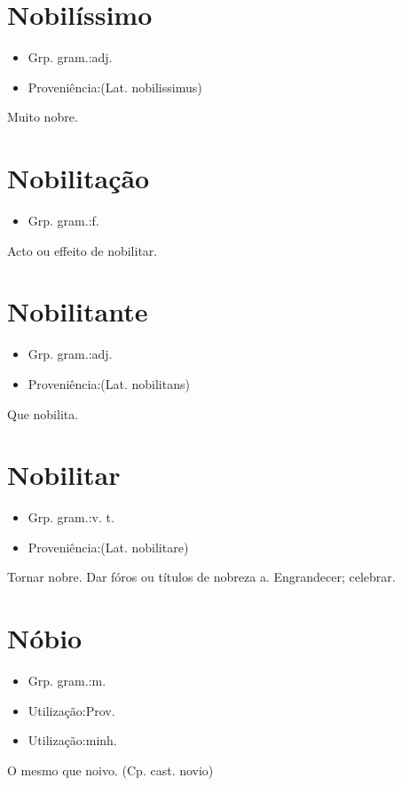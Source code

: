 \section{Nobilíssimo}
\begin{itemize}
\item {Grp. gram.:adj.}
\end{itemize}
\begin{itemize}
\item {Proveniência:(Lat. \textunderscore nobilissimus\textunderscore )}
\end{itemize}
Muito nobre.
\section{Nobilitação}
\begin{itemize}
\item {Grp. gram.:f.}
\end{itemize}
Acto ou effeito de nobilitar.
\section{Nobilitante}
\begin{itemize}
\item {Grp. gram.:adj.}
\end{itemize}
\begin{itemize}
\item {Proveniência:(Lat. \textunderscore nobilitans\textunderscore )}
\end{itemize}
Que nobilita.
\section{Nobilitar}
\begin{itemize}
\item {Grp. gram.:v. t.}
\end{itemize}
\begin{itemize}
\item {Proveniência:(Lat. \textunderscore nobilitare\textunderscore )}
\end{itemize}
Tornar nobre.
Dar fóros ou títulos de nobreza a.
Engrandecer; celebrar.
\section{Nóbio}
\begin{itemize}
\item {Grp. gram.:m.}
\end{itemize}
\begin{itemize}
\item {Utilização:Prov.}
\end{itemize}
\begin{itemize}
\item {Utilização:minh.}
\end{itemize}
O mesmo que \textunderscore noivo\textunderscore .
(Cp. cast. \textunderscore novio\textunderscore )
